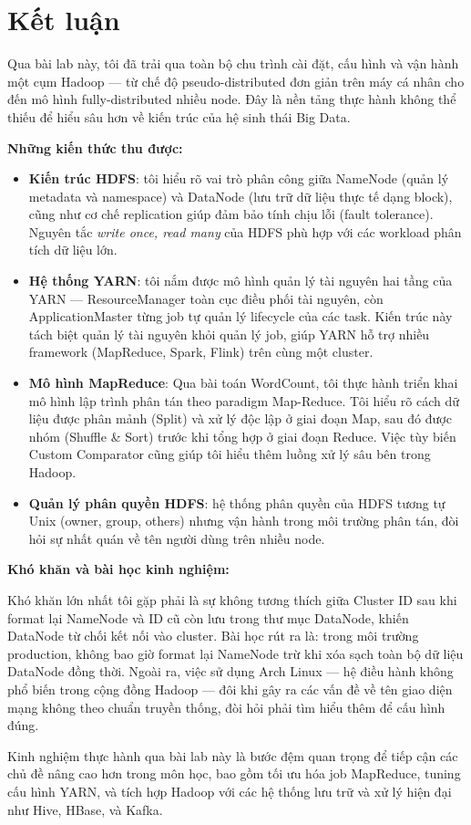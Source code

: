 \section{Kết luận}

Qua bài lab này, tôi đã trải qua toàn bộ chu trình cài đặt, cấu hình và vận hành
một cụm Hadoop — từ chế độ pseudo-distributed đơn giản trên máy cá nhân cho đến
mô hình fully-distributed nhiều node. Đây là nền tảng thực hành không thể thiếu
để hiểu sâu hơn về kiến trúc của hệ sinh thái Big Data.

\textbf{Những kiến thức thu được:}

\begin{itemize}
  \item \textbf{Kiến trúc HDFS}: tôi hiểu rõ vai trò phân công giữa NameNode (quản
        lý metadata và namespace) và DataNode (lưu trữ dữ liệu thực tế dạng block),
        cũng như cơ chế replication giúp đảm bảo tính chịu lỗi (fault tolerance).
        Nguyên tắc \textit{write once, read many} của HDFS phù hợp với các workload
        phân tích dữ liệu lớn.

  \item \textbf{Hệ thống YARN}: tôi nắm được mô hình quản lý tài nguyên hai tầng
        của YARN — ResourceManager toàn cục điều phối tài nguyên, còn ApplicationMaster
        từng job tự quản lý lifecycle của các task. Kiến trúc này tách biệt quản lý
        tài nguyên khỏi quản lý job, giúp YARN hỗ trợ nhiều framework (MapReduce,
        Spark, Flink) trên cùng một cluster.

  \item \textbf{Mô hình MapReduce}: Qua bài toán WordCount, tôi thực hành
        triển khai mô hình lập trình phân tán theo paradigm Map-Reduce. Tôi hiểu rõ 
        cách dữ liệu được phân mảnh (Split) và xử lý độc lập ở giai đoạn Map, sau đó
        được nhóm (Shuffle \& Sort) trước khi tổng hợp ở giai đoạn Reduce. Việc tùy biến 
        Custom Comparator cũng giúp tôi hiểu thêm luồng xử lý sâu bên trong Hadoop.

  \item \textbf{Quản lý phân quyền HDFS}: hệ thống phân quyền của HDFS tương tự
        Unix (owner, group, others) nhưng vận hành trong môi trường phân tán, đòi
        hỏi sự nhất quán về tên người dùng trên nhiều node.
\end{itemize}

\textbf{Khó khăn và bài học kinh nghiệm:}

Khó khăn lớn nhất tôi gặp phải là sự không tương thích giữa Cluster ID sau khi
format lại NameNode và ID cũ còn lưu trong thư mục DataNode, khiến DataNode từ
chối kết nối vào cluster. Bài học rút ra là: trong môi trường production, không bao
giờ format lại NameNode trừ khi xóa sạch toàn bộ dữ liệu DataNode đồng thời. Ngoài
ra, việc sử dụng Arch Linux — hệ điều hành không phổ biến trong cộng đồng Hadoop —
đôi khi gây ra các vấn đề về tên giao diện mạng không theo chuẩn truyền thống, đòi
hỏi phải tìm hiểu thêm để cấu hình đúng.

Kinh nghiệm thực hành qua bài lab này là bước đệm quan trọng để tiếp cận các chủ
đề nâng cao hơn trong môn học, bao gồm tối ưu hóa job MapReduce, tuning cấu hình YARN,
và tích hợp Hadoop với các hệ thống lưu trữ và xử lý hiện đại như Hive, HBase, và
Kafka.
